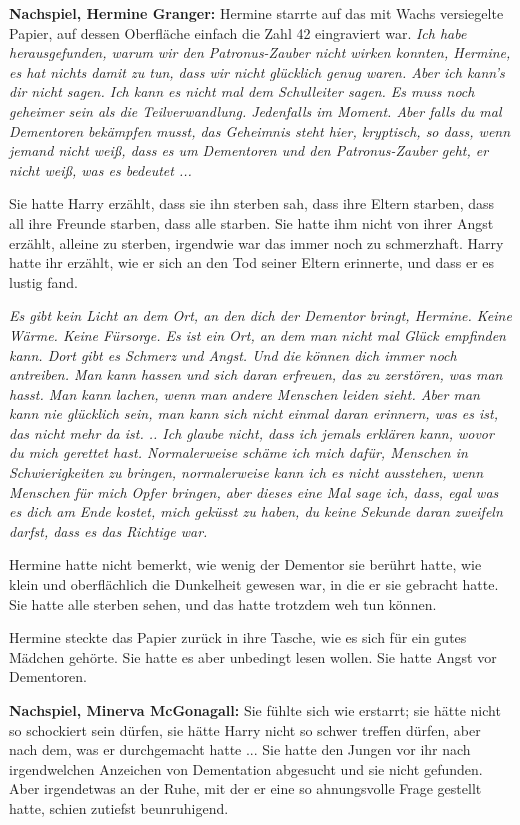 \textbf{Nachspiel, Hermine Granger:}
Hermine starrte auf das mit Wachs versiegelte Papier, auf dessen Oberfläche
einfach die Zahl 42 eingraviert war.
\emph{Ich habe herausgefunden, warum wir den Patronus-Zauber nicht wirken
konnten, Hermine, es hat nichts damit zu tun, dass wir nicht glücklich genug
waren. Aber ich kann's dir nicht sagen. Ich kann es nicht mal dem Schulleiter
sagen. Es muss noch geheimer sein als die Teilverwandlung. Jedenfalls im Moment.
Aber falls du mal Dementoren bekämpfen musst, das Geheimnis steht hier,
kryptisch, so dass, wenn jemand nicht weiß, dass es um Dementoren und den
Patronus-Zauber geht, er nicht weiß, was es bedeutet ...}

Sie hatte Harry erzählt, dass sie ihn sterben sah, dass ihre Eltern starben,
dass all ihre Freunde starben, dass alle starben. Sie hatte ihm nicht von ihrer
Angst erzählt, alleine zu sterben, irgendwie war das immer noch zu schmerzhaft.
Harry hatte ihr erzählt, wie er sich an den Tod seiner Eltern erinnerte, und
dass er es lustig fand.

\emph{Es gibt kein Licht an dem Ort, an den dich der Dementor bringt, Hermine.
Keine Wärme. Keine Fürsorge. Es ist ein Ort, an dem man nicht mal Glück
empfinden kann. Dort gibt es Schmerz und Angst. Und die können dich immer noch
antreiben. Man kann hassen und sich daran erfreuen, das zu zerstören, was man
hasst. Man kann lachen, wenn man andere Menschen leiden sieht. Aber man kann nie
glücklich sein, man kann sich nicht einmal daran erinnern, was es ist, das nicht
mehr da ist. .. Ich glaube nicht, dass ich jemals erklären kann, wovor du mich
gerettet hast. Normalerweise schäme ich mich dafür, Menschen in Schwierigkeiten
zu bringen, normalerweise kann ich es nicht ausstehen, wenn Menschen für mich
Opfer bringen, aber dieses eine Mal sage ich, dass, egal was es dich am Ende
kostet, mich geküsst zu haben, du keine Sekunde daran zweifeln darfst, dass es
das Richtige war.}

Hermine hatte nicht bemerkt, wie wenig der Dementor sie berührt hatte, wie klein
und oberflächlich die Dunkelheit gewesen war, in die er sie gebracht hatte. Sie
hatte alle sterben sehen, und das hatte trotzdem weh tun können.

Hermine steckte das Papier zurück in ihre Tasche, wie es sich für ein gutes
Mädchen gehörte. Sie hatte es aber unbedingt lesen wollen. Sie hatte Angst vor
Dementoren.

\textbf{Nachspiel, Minerva McGonagall:}
Sie fühlte sich wie erstarrt; sie hätte nicht so schockiert sein dürfen, sie
hätte Harry nicht so schwer treffen dürfen, aber nach dem, was er durchgemacht
hatte ... Sie hatte den Jungen vor ihr nach irgendwelchen Anzeichen von
Dementation abgesucht und sie nicht gefunden. Aber irgendetwas an der Ruhe, mit
der er eine so ahnungsvolle Frage gestellt hatte, schien zutiefst beunruhigend.

